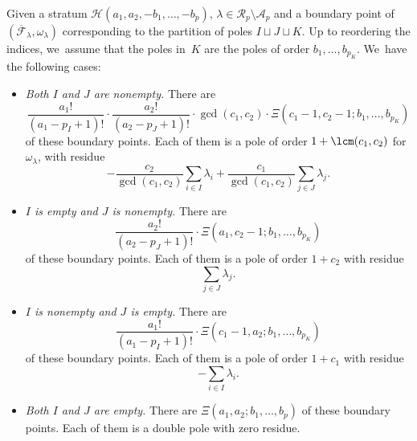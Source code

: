 \begin{prop}\label{prop:flat-boundary}
Given a stratum $\mathcal{H}(a_{1},a_{2},-b_{1},\dots,-b_{p})$, $\lambda \in \mathcal{R}_{p} \setminus \mathcal{A}_{p}$ and a boundary point of $(\overline{\mathcal{F}}_{\lambda}, \omega_\lambda)$ corresponding to the partition of poles $I \sqcup J \sqcup K$. Up to reordering the indices, we~assume that the poles in~$K$ are the poles of order $b_{1},\ldots,b_{p_{K}}$. We~have the following cases:

\begin{itemize}
\item
\emph{Both $I$ and $J$ are nonempty.} There are
\begin{equation}\label{eq:numbnoempty}
\frac{a_{1}!}{(a_{1}-p_{I}+1)!} \cdot \frac{a_{2}!}{(a_{2}-p_{J}+1)!} \cdot \gcd (c_1, c_2) \cdot \Xi(c_{1}-1,c_{2}-1;b_{1},\dots,b_{p_{K}})
\end{equation}
of these boundary points. Each of them is a pole of order
$1 + \lcm (c_1, c_2)$
for $\omega_{\lambda}$, with residue
\begin{equation}\label{eq:resIJnonempty}
-\frac{c_{2}}{\gcd(c_{1},c_{2})}\sum_{i \in I} \lambda_{i} + \frac{c_{1}}{\gcd(c_{1},c_{2})}\sum_{j \in J} \lambda_{j}.
\end{equation}

\item
\emph{$I$ is empty and $J$ is nonempty.} There are
\begin{equation}
\frac{a_{2}!}{(a_{2}-p_{J}+1)!} \cdot \Xi(a_{1},c_{2}-1;b_{1},\dots,b_{p_{K}})
\end{equation}
of these boundary points. Each of them is a pole of order $1 + c_{2}$ with residue
\begin{equation}\label{eq:residuecase2}
\sum_{j \in J} \lambda_{j}.
\end{equation}

\item
\emph{$I$ is nonempty and $J$ is empty.} There are
\begin{equation}
\frac{a_{1}!}{(a_{1}-p_{I}+1)!} \cdot \Xi(c_{1}-1,a_{2};b_{1},\dots,b_{p_{K}})
\end{equation}
of these boundary points. Each of them is a pole of order $1 + c_{1}$ with residue
\begin{equation}
-\sum_{i \in I} \lambda_{i} .
\end{equation}

\item
\emph{Both $I$ and $J$ are empty.} There are $\Xi(a_{1},a_{2};b_{1},\dots,b_{p})$ of these boundary points. Each of them is a double pole with zero residue.
\end{itemize}
\end{prop}


